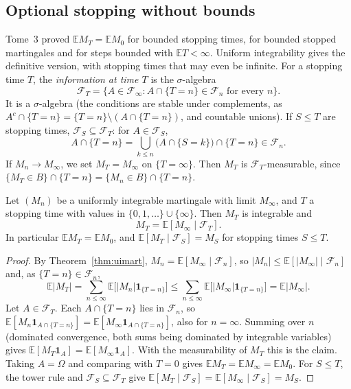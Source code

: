 \subsection*{Optional stopping without bounds}

Tome~3 proved $\mathbb EM_T=\mathbb EM_0$ for bounded stopping times, for bounded stopped martingales and for steps bounded with $\mathbb ET<\infty$. Uniform integrability gives the
definitive version, with stopping times that may even be infinite. For a stopping time $T$, the \emph{information at time $T$} is the $\sigma$-algebra
\[
\mathcal F_T=\bigl\{A\in\mathcal F_\infty:A\cap\{T=n\}\in\mathcal F_n\text{ for every }n\bigr\}.
\]
It is a $\sigma$-algebra (the conditions are stable under complements, as $A^c\cap\{T=n\}=\{T=n\}\setminus(A\cap\{T=n\})$, and countable unions). If $S\le T$ are stopping times, $\mathcal F_S\subseteq\mathcal F_T$: for $A\in\mathcal F_S$,
\[
A\cap\{T=n\}=\bigcup_{k\le n}\bigl(A\cap\{S=k\}\bigr)\cap\{T=n\}\in\mathcal F_n.
\]
If $M_n\to M_\infty$, we set $M_T=M_\infty$ on $\{T=\infty\}$. Then $M_T$ is $\mathcal F_T$-measurable, since $\{M_T\in B\}\cap\{T=n\}=\{M_n\in B\}\cap\{T=n\}$.

\begin{theorem}\label{thm:uiost}
Let $(M_n)$ be a uniformly integrable martingale with limit $M_\infty$, and $T$ a stopping time with values in $\{0,1,\dots\}\cup\{\infty\}$. Then $M_T$ is integrable and
\[
M_T=\mathbb E[M_\infty\mid\mathcal F_T].
\]
In particular $\mathbb EM_T=\mathbb EM_0$, and $\mathbb E[M_T\mid\mathcal F_S]=M_S$ for stopping times $S\le T$.
\end{theorem}
\begin{proof}
By Theorem~\ref{thm:uimart}, $M_n=\mathbb E[M_\infty\mid\mathcal F_n]$, so $|M_n|\le\mathbb E[|M_\infty|\mid\mathcal F_n]$ and, as $\{T=n\}\in\mathcal F_n$,
\[
\mathbb E|M_T|=\sum_{n\le\infty}\mathbb E\bigl[|M_n|\mathbf 1_{\{T=n\}}\bigr]\le\sum_{n\le\infty}\mathbb E\bigl[|M_\infty|\mathbf 1_{\{T=n\}}\bigr]=\mathbb E|M_\infty|.
\]
Let $A\in\mathcal F_T$. Each $A\cap\{T=n\}$ lies in $\mathcal F_n$, so $\mathbb E[M_n\mathbf 1_{A\cap\{T=n\}}]=\mathbb E[M_\infty\mathbf 1_{A\cap\{T=n\}}]$, also for $n=\infty$. Summing over $n$ (dominated convergence, both
sums being dominated by integrable variables) gives $\mathbb E[M_T\mathbf 1_A]=\mathbb E[M_\infty\mathbf 1_A]$. With the measurability of $M_T$ this is the claim. Taking $A=\Omega$ and comparing with
$T=0$ gives $\mathbb EM_T=\mathbb EM_\infty=\mathbb EM_0$. For $S\le T$, the tower rule and $\mathcal F_S\subseteq\mathcal F_T$ give
$\mathbb E[M_T\mid\mathcal F_S]=\mathbb E[M_\infty\mid\mathcal F_S]=M_S$.
\end{proof}

